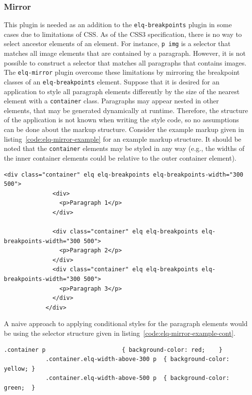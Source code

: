 \documentclass[a4paper,11pt]{kth-mag}
\newcommand{\code}[1]{\texttt{#1}}
\begin{document}
        \subsubsection{Mirror}
          This plugin is needed as an addition to the \code{elq-breakpoints} plugin in some cases due to limitations of CSS.
          As of the \gls{CSS3} specification, there is no way to select ancestor elements of an element.
          For instance, \code{p img} is a selector that matches all image elements that are contained by a paragraph.
          However, it is not possible to construct a selector that matches all paragraphs that contains images.
          The \code{elq-mirror} plugin overcome these limitations by mirroring the breakpoint classes of an \code{elq-breakpoints} element.
          Suppose that it is desired for an application to style all paragraph elements differently by the size of the nearest element with a \code{container} class.
          Paragraphs may appear nested in other elements, that may be generated dynamically at runtime.
          Therefore, the structure of the application is not known when writing the style code, so no assumptions can be done about the markup structure.
          Consider the example markup given in listing~\ref{code:elq-mirror-example} for an example markup structure.
          It should be noted that the \code{container} elements may be styled in any way (e.g., the widths of the inner container elements could be relative to the outer container element).
          \begin{lstlisting}[gobble=12,caption={Example markup structure where all paragraphs are desired to be conditionally styled by the nearest ancestor container.},captionpos=b,label={code:elq-mirror-example}]
            <div class="container" elq elq-breakpoints elq-breakpoints-width="300 500">
              <div>
                <p>Paragraph 1</p>
              </div>

              <div class="container" elq elq-breakpoints elq-breakpoints-width="300 500">
                <p>Paragraph 2</p>
              </div>
              <div class="container" elq elq-breakpoints elq-breakpoints-width="300 500">
                <p>Paragraph 3</p>
              </div>
            </div>
          \end{lstlisting}
          A naive approach to applying conditional styles for the paragraph elements would be using the selector structure given in listing~\ref{code:elq-mirror-example-cont}.
          \begin{lstlisting}[gobble=12,caption={A naive approach to styling the paragraphs conditionally.},captionpos=b,label={code:elq-mirror-example-cont}]
            .container p                      { background-color: red;    }
            .container.elq-width-above-300 p  { background-color: yellow; }
            .container.elq-width-above-500 p  { background-color: green;  }
          \end{lstlisting}
\end{document}
